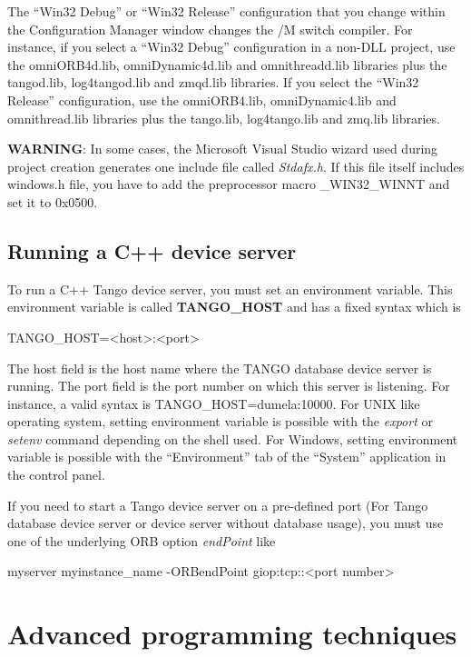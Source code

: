 The ``Win32 Debug'' or ``Win32 Release'' configuration that you
change within the \textquotedbl{}Configuration Manager\textquotedbl{}
window changes the /M switch compiler. For instance, if you select
a ``Win32 Debug'' configuration in a \textquotedbl{}non-DLL\textquotedbl{}
project, use the omniORB4d.lib, omniDynamic4d.lib and omnithreadd.lib
libraries plus the tangod.lib, log4tangod.lib and zmqd.lib libraries.
If you select the ``Win32 Release'' configuration, use the omniORB4.lib,
omniDynamic4.lib and omnithread.lib libraries plus the tango.lib,
log4tango.lib and zmq.lib libraries.

\textbf{WARNING}: In some cases, the Microsoft Visual Studio wizard
used during project creation generates one include file called \emph{Stdafx.h}.
If this file itself includes windows.h file, you have to add the preprocessor
macro \_WIN32\_WINNT and set it to 0x0500.


\subsection{Running a C++ device server\label{Env variable}}

To run a C++ Tango device server, you must set an environment variable.
This environment variable is called \textbf{TANGO\_HOST}
and has a fixed syntax which is \begin{center}TANGO\_HOST=<host>:<port>\end{center}The
host field is the host name where the TANGO database device server
is running. The port field is the port number on which this server
is listening. For instance, a valid syntax is TANGO\_HOST=dumela:10000.
For UNIX like operating system, setting environment variable is possible
with the \emph{export} or \emph{setenv} command depending on the shell
used. For Windows, setting environment variable is possible with the
``Environment'' tab of the ``System'' application in the control
panel.

If you need to start a Tango device server on a pre-defined port
(For Tango database device server or device server without database
usage), you must use one of the underlying ORB option \emph{endPoint}
like \begin{center}myserver myinstance\_name -ORBendPoint giop:tcp::<port
number>\end{center}


\section{Advanced programming techniques}


